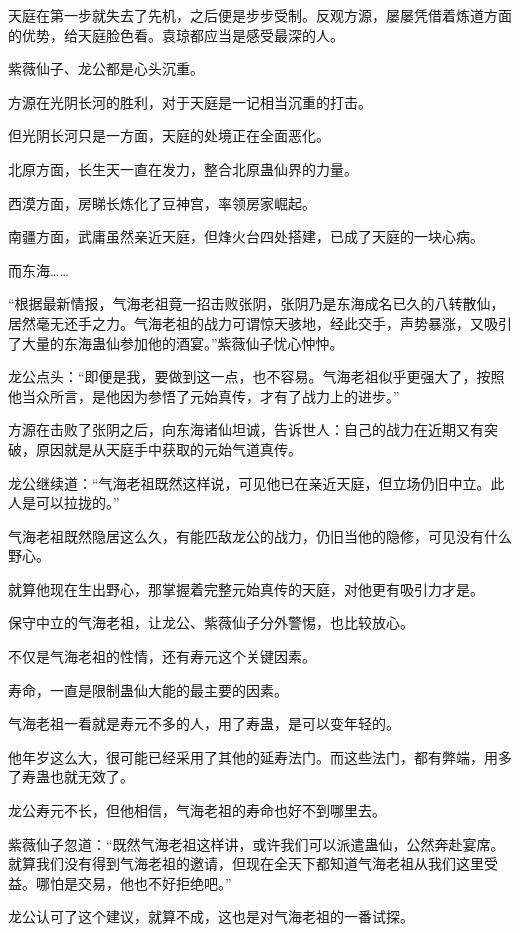 \begin{this_body}
天庭在第一步就失去了先机，之后便是步步受制。反观方源，屡屡凭借着炼道方面的优势，给天庭脸色看。袁琼都应当是感受最深的人。

紫薇仙子、龙公都是心头沉重。

方源在光阴长河的胜利，对于天庭是一记相当沉重的打击。

但光阴长河只是一方面，天庭的处境正在全面恶化。

北原方面，长生天一直在发力，整合北原蛊仙界的力量。

西漠方面，房睇长炼化了豆神宫，率领房家崛起。

南疆方面，武庸虽然亲近天庭，但烽火台四处搭建，已成了天庭的一块心病。

而东海……

“根据最新情报，气海老祖竟一招击败张阴，张阴乃是东海成名已久的八转散仙，居然毫无还手之力。气海老祖的战力可谓惊天骇地，经此交手，声势暴涨，又吸引了大量的东海蛊仙参加他的酒宴。”紫薇仙子忧心忡忡。

龙公点头：“即便是我，要做到这一点，也不容易。气海老祖似乎更强大了，按照他当众所言，是他因为参悟了元始真传，才有了战力上的进步。”

方源在击败了张阴之后，向东海诸仙坦诚，告诉世人：自己的战力在近期又有突破，原因就是从天庭手中获取的元始气道真传。

龙公继续道：“气海老祖既然这样说，可见他已在亲近天庭，但立场仍旧中立。此人是可以拉拢的。”

气海老祖既然隐居这么久，有能匹敌龙公的战力，仍旧当他的隐修，可见没有什么野心。

就算他现在生出野心，那掌握着完整元始真传的天庭，对他更有吸引力才是。

保守中立的气海老祖，让龙公、紫薇仙子分外警惕，也比较放心。

不仅是气海老祖的性情，还有寿元这个关键因素。

寿命，一直是限制蛊仙大能的最主要的因素。

气海老祖一看就是寿元不多的人，用了寿蛊，是可以变年轻的。

他年岁这么大，很可能已经采用了其他的延寿法门。而这些法门，都有弊端，用多了寿蛊也就无效了。

龙公寿元不长，但他相信，气海老祖的寿命也好不到哪里去。

紫薇仙子忽道：“既然气海老祖这样讲，或许我们可以派遣蛊仙，公然奔赴宴席。就算我们没有得到气海老祖的邀请，但现在全天下都知道气海老祖从我们这里受益。哪怕是交易，他也不好拒绝吧。”

龙公认可了这个建议，就算不成，这也是对气海老祖的一番试探。


\end{this_body}
